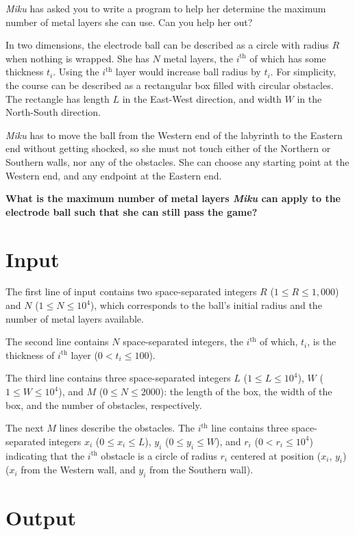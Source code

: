 \documentclass[12pt]{article}
\begin{document}
\textit{Miku} has asked you to write a program to help her determine the maximum number of metal layers she can use. Can you help her out?

In two dimensions, the electrode ball can be described as a circle with radius $R$ when nothing is wrapped. She has $N$ metal layers, the $i^\text{th}$ of which has some thickness $t_i$. Using the $i^\text{th}$ layer would increase ball radius by $t_i$. For simplicity, the course can be described as a rectangular box filled with circular obstacles. The rectangle has length $L$ in the East-West direction, and width $W$ in the North-South direction.

\textit{Miku} has to move the ball from the Western end of the labyrinth to the Eastern end without getting shocked, so she must not touch either of the Northern or Southern walls, nor any of the obstacles. She can choose any starting point at the Western end, and any endpoint at the Eastern end.

\textbf{What is the maximum number of metal layers \textit{Miku} can apply to the electrode ball such that she can still pass the game?}

\section{Input}

The first line of input contains two space-separated integers $R$ ($1 \leq R \leq 1,000$) and $N$ ($1 \leq N \leq 10^4$), which corresponds to the ball's initial radius and the number of metal layers available.

The second line contains $N$ space-separated integers, the $i^\text{th}$ of which, $t_i$, is the thickness of $i^\text{th}$ layer ($0 < t_i \leq 100$).

The third line contains three space-separated integers $L$ ($1 \leq L \leq 10^4$), $W$ ($1 \leq W \leq 10^4$), and $M$ ($0 \leq N \leq 2000$): the length of the box, the width of the box, and the number of obstacles, respectively.

The next $M$ lines describe the obstacles. The $i^\text{th}$ line contains three space-separated integers $x_i$ ($0 \leq x_i \leq L$), $y_i$ ($0 \leq y_i \leq W$), and $r_i$ ($0 < r_i \leq 10^4$) indicating that the $i^\text{th}$ obstacle is a circle of radius $r_i$ centered at position ($x_i$, $y_i$) ($x_i$ from the Western wall, and $y_i$ from the Southern wall).

\section{Output}
\end{document}
